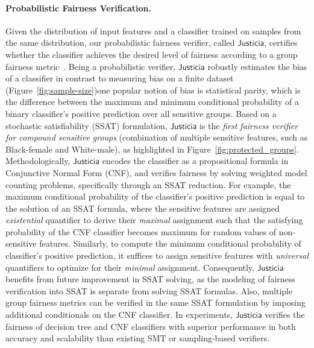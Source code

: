 \documentclass{article}
\begin{document}
	\paragraph{Probabilistic Fairness Verification.} Given the distribution of input features and a classifier trained on samples from the same distribution, our probabilistic fairness verifier, called $ \mathsf{Justicia} $, certifies whether the classifier achieves the desired level of fairness according to a group fairness metric~\cite{ghosh2021justicia}. Being a probabilistic verifier, $ \mathsf{Justicia} $ robustly estimates the bias of a classifier in contrast to measuring bias on a finite dataset (Figure~\ref{fig:sample-size})\textemdash one popular notion of bias is statistical parity, which is the difference between the maximum and minimum conditional probability of a binary classifier's positive prediction over all sensitive groups. Based on a stochastic satisfiability (SSAT) formulation, $ \mathsf{Justicia} $ is the \emph{first fairness verifier for compound sensitive groups} (combination of multiple sensitive features, such as Black-female and White-male), as highlighted in Figure~\ref{fig:protected_groups}. Methodologically, $ \mathsf{Justicia} $ encodes the classifier as a propositional formula in Conjunctive Normal Form (CNF), and verifies fairness by solving weighted model counting problems, specifically through an SSAT reduction. For example, the maximum conditional probability of the classifier's positive prediction is equal to the solution of an SSAT formula, where the sensitive features are assigned \emph{existential} quantifier to derive their \emph{maximal} assignment such that the satisfying probability of the CNF classifier becomes maximum for random values of non-sensitive features. Similarly, to compute the minimum conditional probability of classifier's positive prediction, it suffices to assign sensitive features with \emph{universal} quantifiers to optimize for their \emph{minimal} assignment. Consequently, $ \mathsf{Justicia} $ benefits from future improvement in SSAT solving, as the modeling of fairness verification into SSAT is separate from solving SSAT formulas. Also, multiple group fairness metrics can be verified in the same SSAT formulation by imposing additional conditionals on the CNF classifier. In experiments, $ \mathsf{Justicia} $ verifies the fairness of decision tree and CNF classifiers with superior performance in both accuracy and scalability than existing SMT or sampling-based verifiers. 
	
	
\end{document}
